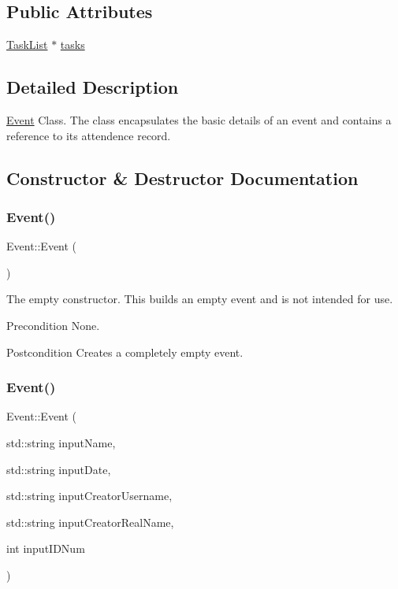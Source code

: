 \subsection*{Public Attributes}
\begin{DoxyCompactItemize}
\item 
\mbox{\hyperlink{class_task_list}{Task\+List}} $\ast$ \mbox{\hyperlink{class_event_a20fc63392defc87c1798e53a6f12832b}{tasks}}
\end{DoxyCompactItemize}


\subsection{Detailed Description}
\mbox{\hyperlink{class_event}{Event}} Class. The class encapsulates the basic details of an event and contains a reference to its attendence record. 

\subsection{Constructor \& Destructor Documentation}
\mbox{\label{class_event_a5a40dd4708297f7031e29b39e039ae10}} 
\subsubsection{\texorpdfstring{Event()}{Event()}\hspace{0.1cm}{\footnotesize\ttfamily [1/2]}}
{\footnotesize\ttfamily Event\+::\+Event (\begin{DoxyParamCaption}{ }\end{DoxyParamCaption})}

The empty constructor. This builds an empty event and is not intended for use. \begin{DoxyPrecond}{Precondition}
None. 
\end{DoxyPrecond}
\begin{DoxyPostcond}{Postcondition}
Creates a completely empty event. 
\end{DoxyPostcond}
\mbox{\label{class_event_a5104d721f8a1b03dacbb8c40ef4bcb82}} 
\subsubsection{\texorpdfstring{Event()}{Event()}\hspace{0.1cm}{\footnotesize\ttfamily [2/2]}}
{\footnotesize\ttfamily Event\+::\+Event (\begin{DoxyParamCaption}\item[{std\+::string}]{input\+Name,  }\item[{std\+::string}]{input\+Date,  }\item[{std\+::string}]{input\+Creator\+Username,  }\item[{std\+::string}]{input\+Creator\+Real\+Name,  }\item[{int}]{input\+I\+D\+Num }\end{DoxyParamCaption})}

